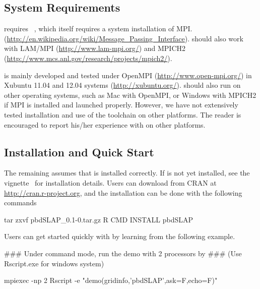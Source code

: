 \subsection[System Requirements]{System Requirements}
\label{sec:system_requirements}

 requires ~\citep{Chen2012pbdMPIpackage}, which
itself requires a system installation of MPI.
(\url{http://en.wikipedia.org/wiki/Message_Passing_Interface}).
 should also
work with LAM/MPI (\url{http://www.lam-mpi.org/}) and
MPICH2 (\url{http://www.mcs.anl.gov/research/projects/mpich2/}).

 is mainly developed and tested under
{\color{blue} OpenMPI} (\url{http://www.open-mpi.org/}) in
Xubuntu 11.04 and 12.04 systems (\url{http://xubuntu.org/}).
 should also run on other operating systems, such as
Mac with OpenMPI, or Windows with MPICH2 if MPI is installed and launched
properly.  However, we have not extensively tested installation and use of
the  toolchain on other platforms. 
The reader is encouraged to report his/her experience with 
on other platforms.


\subsection[Installation and Quick Start]{Installation and Quick Start}
\label{sec:installation}

The remaining assumes that  is installed correctly.
If  is not yet installed, see the 
vignette~\citep{Chen2012pbdMPIvignette} for installation details.
Users can download  from CRAN at
\url{http://cran.r-project.org}, and
the installation can be done with the following commands
\begin{Command}
tar zxvf pbdSLAP_0.1-0.tar.gz
R CMD INSTALL pbdSLAP
\end{Command}

Users can get started quickly with  by learning from the
following example.
\begin{Command}
### Under command mode, run the demo with 2 processors by
### (Use Rscript.exe for windows system)

mpiexec -np 2 Rscript -e "demo(gridinfo,'pbdSLAP',ask=F,echo=F)"
\end{Command}

